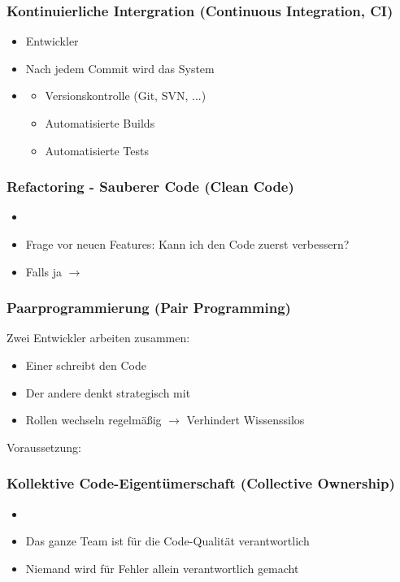 \subsubsection*{Kontinuierliche Intergration (Continuous Integration, CI)}
\begin{itemize}
    \item Entwickler 
    \item Nach jedem Commit wird das System 
    \item {}
    \begin{itemize}
        \item Versionskontrolle (Git, SVN, ...)
        \item Automatisierte Builds
        \item Automatisierte Tests
    \end{itemize}
\end{itemize}
\subsubsection*{Refactoring - Sauberer Code (Clean Code)}
\begin{itemize}
    \item {}
    \item Frage vor neuen Features: Kann ich den Code zuerst verbessern?
    \item Falls ja $\rightarrow$ 
\end{itemize}
\subsubsection*{Paarprogrammierung (Pair Programming)}
Zwei Entwickler arbeiten zusammen:
\begin{itemize}
    \item Einer schreibt den Code
    \item Der andere denkt strategisch mit
    \item Rollen wechseln regelmäßig $\rightarrow$ Verhindert Wissenssilos
\end{itemize}
Voraussetzung: 
\subsubsection*{Kollektive Code-Eigentümerschaft (Collective Ownership)}
\begin{itemize}
    \item {}
    \item Das ganze Team ist für die Code-Qualität verantwortlich
    \item Niemand wird für Fehler allein verantwortlich gemacht
\end{itemize}
